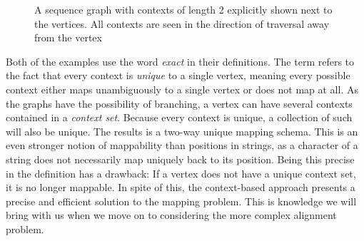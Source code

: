 \documentclass[thesis.tex]{subfiles}
\begin{document}
\begin{figure}[!hb]
  \begin{mdframed}
    \begin{center}
  \end{center}
  \end{mdframed}
  \caption[A sequence graph with contexts]{A sequence graph with contexts of length 2 explicitly shown next to the vertices. All contexts are seen in the direction of traversal away from the vertex}
  \label{fig:contexts_example}
\end{figure}
\clearpage\noindent
Both of the examples use the word \textit{exact} in their definitions. The term refers to the fact that every context is \textit{unique} to a single vertex, meaning every possible context either maps unambiguously to a single vertex or does not map at all. As the graphs have the possibility of branching, a vertex can have several contexts contained in a \textit{context set}. Because every context is unique, a collection of such will also be unique. The results is a two-way unique mapping schema. This is an even stronger notion of mappability than positions in strings, as a character of a string does not necessarily map uniquely back to its position. Being this precise in the definition has a drawback: If a vertex does not have a unique context set, it is no longer mappable. In spite of this, the context-based approach presents a precise and efficient solution to the mapping problem. This is knowledge we will bring with us when we move on to considering the more complex alignment problem.
\end{document}
